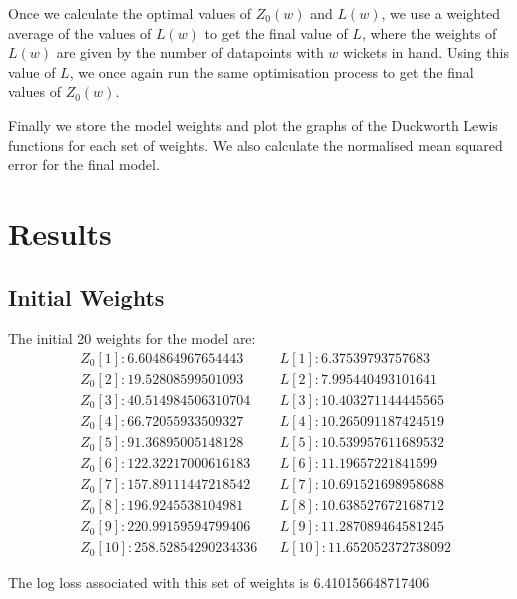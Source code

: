 \documentclass[12pt]{article}
\begin{document}
Once we calculate the optimal values of $Z_0(w)$ and $L(w)$, we use a weighted average of the values of $L(w)$ to get the final value of $L$, where the weights of $L(w)$ are given by the number of datapoints with $w$ wickets in hand. Using this value of $L$, we once again run the same optimisation process to get the final values of $Z_0(w)$.

Finally we store the model weights and plot the graphs of the Duckworth Lewis functions for each set of weights. We also calculate the normalised mean squared error for the final model.


\section*{Results}
\subsection*{Initial Weights}
The initial 20 weights for the model are:
\begin{align*}
    &Z_0[1]: 6.604864967654443    &&L[1]: 6.37539793757683 \\
    &Z_0[2]: 19.52808599501093    &&L[2]: 7.995440493101641 \\
    &Z_0[3]: 40.514984506310704   &&L[3]: 10.403271144445565 \\
    &Z_0[4]: 66.72055933509327    &&L[4]: 10.265091187424519 \\
    &Z_0[5]: 91.36895005148128    &&L[5]: 10.539957611689532 \\
    &Z_0[6]: 122.32217000616183   &&L[6]: 11.19657221841599 \\
    &Z_0[7]: 157.89111447218542   &&L[7]: 10.691521698958688 \\
    &Z_0[8]: 196.9245538104981    &&L[8]: 10.638527672168712 \\ 
    &Z_0[9]: 220.99159594799406   &&L[9]: 11.287089464581245 \\
    &Z_0[10]: 258.52854290234336  &&L[10]: 11.652052372738092 
\end{align*}

The log loss associated with this set of weights is 6.410156648717406
\end{document}

